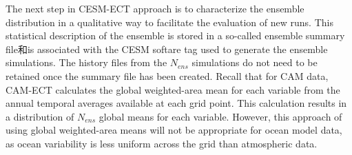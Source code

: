 

The next step in CESM-ECT approach is to characterize the ensemble distribution in a qualitative way to facilitate the evaluation of new runs.  This statistical description of the ensemble is stored in a so-called ensemble summary file和is associated with the CESM softare tag used to generate the ensemble simulations.  The history files from the $N_{ens}$ simulations do not need to be retained once the summary file has been created.  Recall that for CAM data, CAM-ECT calculates the global weighted-area mean for each variable from the annual temporal averages available at each grid point.  This calculation results in a distribution of $N_{ens}$ global means for each variable. However, this approach of using global weighted-area means will not be appropriate for ocean model data, as ocean variability is less uniform across the grid than atmospheric data.

